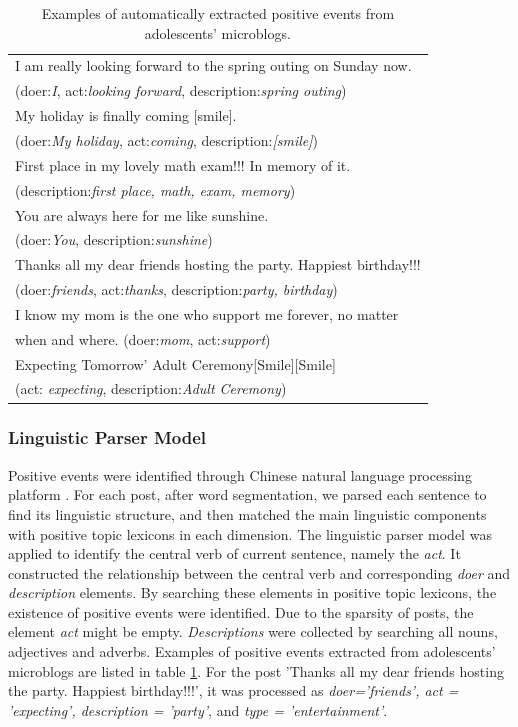 \begin{table}[h]
\begin{center}
\caption{\small{Examples of automatically extracted positive events from adolescents' microblogs.}}
\small{
\begin{tabular}{|l|} \hline
I am really looking forward to the spring outing on Sunday now. \\
(doer:\emph{I}, act:\emph{looking forward}, description:\emph{spring outing})\\\hline
My holiday is finally coming [smile]. \\
(doer:\emph{My holiday}, act:\emph{coming}, description:\emph{[smile]})\\\hline
First place in my lovely math exam!!! In memory of it.\\
(description:\emph{first place, math, exam, memory})\\\hline
You are always here for me like sunshine. \\
(doer:\emph{You}, description:\emph{sunshine})\\\hline
Thanks all my dear friends hosting the party.
Happiest birthday!!!\\
(doer:\emph{friends}, act:\emph{thanks}, description:\emph{party, birthday})\\\hline
I know my mom is the one who support me forever, no matter \\
when and where. (doer:\emph{mom}, act:\emph{support})\\ \hline
Expecting Tomorrow' Adult Ceremony[Smile][Smile]~~\\
(act: \emph{expecting}, description:\emph{Adult Ceremony})\\\hline
\end{tabular}}
\label{tab:uplifts}
\end{center}
\end{table}

\subsubsection{Linguistic Parser Model}
Positive events were identified through Chinese natural language processing platform \citep{Che2010}.
For each post, after word segmentation, we parsed each sentence to find its linguistic structure,
and then matched the main linguistic components with positive topic lexicons in each dimension.
The linguistic parser model was applied to identify the central verb of current sentence, namely the \emph{act}.
It constructed the relationship between the central verb and corresponding \emph{doer} and \emph{description} elements.
By searching these elements in positive topic lexicons,
the existence of positive events were identified.
Due to the sparsity of posts, the element \emph{act} might be empty.
\emph{Descriptions} were collected by searching all nouns, adjectives and adverbs.
Examples of positive events extracted from adolescents' microblogs are listed in table \ref{tab:uplifts}.
For the post 'Thanks all my dear friends hosting the party. Happiest birthday!!!',
it was processed as \emph{doer='friends', act = 'expecting', description = 'party'},
and \emph{type = 'entertainment'}.

